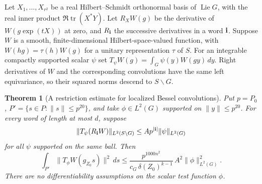 \documentclass[a4paper,11pt]{article}
\newtheorem{theorem}[proposition]{Theorem}
\theoremstyle{definition}
\theoremstyle{remark}
\numberwithin{equation}{section}
\begin{document}
Let \(X_1,\ldots,X_{r^2}\) be a real Hilbert--Schmidt orthonormal
basis of \(\operatorname{Lie}G\), with the real inner product
\(\Re\operatorname{tr}(X^*Y)\). Let \(R_X W(g)\) be the
derivative of \(W(g\exp(tX))\) at zero, and \(R_{\bf i}\) the
successive derivatives in a word \({\bf i}\). Suppose \(W\) is a
smooth, finite-dimensional Hilbert-space-valued function, with
\(W(hg)=\tau(h)W(g)\) for a unitary representation \(\tau\) of \(S\).
For an integrable compactly supported scalar \(\psi\) set
\(T_\psi W(g)=\int_G\psi(y)W(gy)\,dy\). Right derivatives of
\(W\) and the corresponding convolutions have the same left
equivariance, so their squared norms descend to \(S\backslash G\).

\begin{theorem}[A restriction estimate for localized Bessel convolutions]
\leavevmode\label{thm:gramrestriction683}
Put \(p=P_0\), \(P'=\{s\in P:\|s\|\le p^{20}\}\), and take
\(\phi\in L^2(G)\) supported on \(\|y\|\le p^{20}\).
For every word of length at most \(d\), suppose
\[
       \|T_\psi(R_{\bf i}W)\|_{L^2(S\backslash G)}
              \le A p^{|{\bf i}|}\|\psi\|_{L^2(G)}
\]
for all \(\psi\) supported on the same ball. Then
\[
 \int_{P'}\|T_\phi W(g_{Z_0}s)\|^2\,ds
       \le \frac{p^{1000n^2}}{c_G\,\delta(Z_0)^{k-1}}\,
                      A^2\|\phi\|_{L^2(G)}^2 .
\]
There are no differentiability assumptions on the scalar test
function \(\phi\).
\end{theorem}
\end{document}
